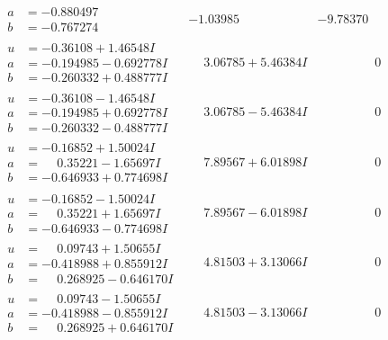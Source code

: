 \documentclass[1p]{elsarticle_modified}
\theoremstyle{definition}
\begin{document}
$$\begin{array}{c|c|c}
\begin{aligned}
a &= -0.880497\phantom{ +0.000000I} \\
b &= -0.767274\phantom{ +0.000000I}\end{aligned}
 & -1.03985\phantom{ +0.000000I} & -9.78370\phantom{ +0.000000I} \\ \hline\begin{aligned}
u &= -0.36108 + 1.46548 I \\
a &= -0.194985 - 0.692778 I \\
b &= -0.260332 + 0.488777 I\end{aligned}
 & \phantom{-}3.06785 + 5.46384 I & \phantom{-0.000000 } 0 \\ \hline\begin{aligned}
u &= -0.36108 - 1.46548 I \\
a &= -0.194985 + 0.692778 I \\
b &= -0.260332 - 0.488777 I\end{aligned}
 & \phantom{-}3.06785 - 5.46384 I & \phantom{-0.000000 } 0 \\ \hline\begin{aligned}
u &= -0.16852 + 1.50024 I \\
a &= \phantom{-}0.35221 - 1.65697 I \\
b &= -0.646933 + 0.774698 I\end{aligned}
 & \phantom{-}7.89567 + 6.01898 I & \phantom{-0.000000 } 0 \\ \hline\begin{aligned}
u &= -0.16852 - 1.50024 I \\
a &= \phantom{-}0.35221 + 1.65697 I \\
b &= -0.646933 - 0.774698 I\end{aligned}
 & \phantom{-}7.89567 - 6.01898 I & \phantom{-0.000000 } 0 \\ \hline\begin{aligned}
u &= \phantom{-}0.09743 + 1.50655 I \\
a &= -0.418988 + 0.855912 I \\
b &= \phantom{-}0.268925 - 0.646170 I\end{aligned}
 & \phantom{-}4.81503 + 3.13066 I & \phantom{-0.000000 } 0 \\ \hline\begin{aligned}
u &= \phantom{-}0.09743 - 1.50655 I \\
a &= -0.418988 - 0.855912 I \\
b &= \phantom{-}0.268925 + 0.646170 I\end{aligned}
 & \phantom{-}4.81503 - 3.13066 I & \phantom{-0.000000 } 0 \\ \hline\begin{aligned}

\end{aligned}
\end{array}$$
\end{document}
